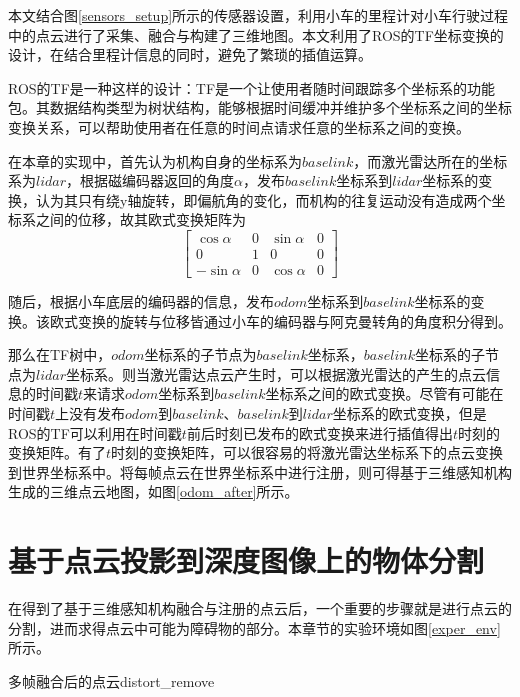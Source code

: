 本文结合图\ref{sensors_setup}所示的传感器设置，利用小车的里程计对小车行驶过程中的点云进行了采集、融合与构建了三维地图。本文利用了ROS的TF坐标变换的设计，在结合里程计信息的同时，避免了繁琐的插值运算。

ROS的TF是一种这样的设计：TF是一个让使用者随时间跟踪多个坐标系的功能包。其数据结构类型为树状结构，能够根据时间缓冲并维护多个坐标系之间的坐标变换关系，可以帮助使用者在任意的时间点请求任意的坐标系之间的变换。

在本章的实现中，首先认为机构自身的坐标系为$baselink$，而激光雷达所在的坐标系为$lidar$，根据磁编码器返回的角度$\alpha$，发布$baselink$坐标系到$lidar$坐标系的变换，认为其只有绕y轴旋转，即偏航角的变化，而机构的往复运动没有造成两个坐标系之间的位移，故其欧式变换矩阵为
$$
\begin{bmatrix}
    \cos \alpha & 0 & \sin \alpha & 0\\
    0 & 1& 0 & 0\\
    -\sin \alpha & 0 & \cos \alpha & 0 
\end{bmatrix}
$$

随后，根据小车底层的编码器的信息，发布$odom$坐标系到$baselink$坐标系的变换。该欧式变换的旋转与位移皆通过小车的编码器与阿克曼转角的角度积分得到。


那么在TF树中，$odom$坐标系的子节点为$baselink$坐标系，$baselink$坐标系的子节点为$lidar$坐标系。则当激光雷达点云产生时，可以根据激光雷达的产生的点云信息的时间戳$t$来请求$odom$坐标系到$baselink$坐标系之间的欧式变换。尽管有可能在时间戳$t$上没有发布$odom$到$baselink$、$baselink$到$lidar$坐标系的欧式变换，但是ROS的TF可以利用在时间戳$t$前后时刻已发布的欧式变换来进行插值得出$t$时刻的变换矩阵。有了$t$时刻的变换矩阵，可以很容易的将激光雷达坐标系下的点云变换到世界坐标系中。将每帧点云在世界坐标系中进行注册，则可得基于三维感知机构生成的三维点云地图，如图\ref{odom_after}所示。

\section{基于点云投影到深度图像上的物体分割}

在得到了基于三维感知机构融合与注册的点云后，一个重要的步骤就是进行点云的分割，进而求得点云中可能为障碍物的部分。本章节的实验环境如图\ref{exper_env}所示。
\begin{pics}[htbp]{多帧融合后的点云}{distort_remove}
\end{pics}

